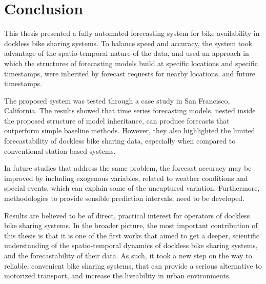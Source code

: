 \documentclass[12pt,oneside]{reedthesis}
\begin{document}
\chapter{Conclusion}\label{six}

This thesis presented a fully automated forecasting system for bike
availability in dockless bike sharing systems. To balance speed and
accuracy, the system took advantage of the spatio-temporal nature of the
data, and used an approach in which the structures of forecasting models
build at specific locations and specific timestamps, were inherited by
forecast requests for nearby locations, and future timestamps.

The proposed system was tested through a case study in San Francisco,
California. The results showed that time series forecasting models,
nested inside the proposed structure of model inheritance, can produce
forecasts that outperform simple baseline methods. However, they also
highlighted the limited forecastability of dockless bike sharing data,
especially when compared to conventional station-based systems.

In future studies that address the same problem, the forecast accuracy
may be improved by including exogenous variables, related to weather
conditions and special events, which can explain some of the uncaptured
variation. Furthermore, methodologies to provide sensible prediction
intervals, need to be developed.

Results are believed to be of direct, practical interest for operators
of dockless bike sharing systems. In the broader picture, the most
important contribution of this thesis is that it is one of the first
works that aimed to get a deeper, scientific understanding of the
spatio-temporal dynamics of dockless bike sharing systems, and the
forecastability of their data. As such, it took a new step on the way to
reliable, convenient bike sharing systems, that can provide a serious
alternative to motorized transport, and increase the liveability in
urban environments.

\appendix
\end{document}
